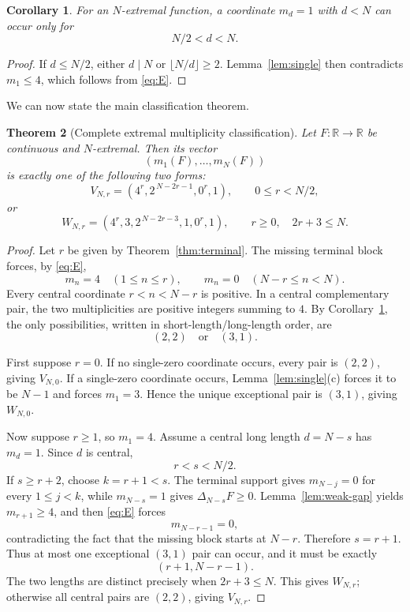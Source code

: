 \documentclass[11pt]{article}
\newtheorem{theorem}{Theorem}[section]
\newtheorem{corollary}[theorem]{Corollary}
\theoremstyle{definition}
\theoremstyle{remark}
\newcommand{\R}{\mathbb{R}}
\begin{document}
\begin{corollary}\label{cor:single-upper}
For an \(N\)-extremal function, a coordinate \(m_d=1\) with \(d<N\)
can occur only for
\[
N/2<d<N.
\]
\end{corollary}

\begin{proof}
If \(d\le N/2\), either \(d\mid N\) or
\(\lfloor N/d\rfloor\ge2\).  Lemma~\ref{lem:single} then contradicts
\(m_1\le4\), which follows from \eqref{eq:E}.
\end{proof}

We can now state the main classification theorem.

\begin{theorem}[Complete extremal multiplicity classification]
\label{thm:classification}
Let \(F:\R\to\R\) be continuous and \(N\)-extremal.
Then its vector
\[
(m_1(F),\ldots,m_N(F))
\]
is exactly one of the following two forms:
\[
V_{N,r}
=
(4^r,2^{\,N-2r-1},0^r,1),
\qquad 0\le r<N/2,
\tag{5.1}\label{eq:V}
\]
or
\[
W_{N,r}
=
(4^r,3,2^{\,N-2r-3},1,0^r,1),
\qquad r\ge0,\quad 2r+3\le N.
\tag{5.2}\label{eq:W}
\]
\end{theorem}

\begin{proof}
Let \(r\) be given by Theorem~\ref{thm:terminal}.  The missing terminal
block forces, by \eqref{eq:E},
\[
m_n=4\quad(1\le n\le r),
\qquad
m_n=0\quad(N-r\le n<N).
\]
Every central coordinate \(r<n<N-r\) is positive.  In a central
complementary pair, the two multiplicities are positive integers summing
to \(4\).  By Corollary~\ref{cor:single-upper}, the only possibilities,
written in short-length/long-length order, are
\[
(2,2)\quad\text{or}\quad(3,1).
\tag{5.3}
\]

First suppose \(r=0\).  If no single-zero coordinate occurs, every pair
is \((2,2)\), giving \(V_{N,0}\).  If a single-zero coordinate occurs,
Lemma~\ref{lem:single}(c) forces it to be \(N-1\) and forces
\(m_1=3\).  Hence the unique exceptional pair is \((3,1)\), giving
\(W_{N,0}\).

Now suppose \(r\ge1\), so \(m_1=4\).  Assume a central long length
\(d=N-s\) has \(m_d=1\).  Since \(d\) is central,
\[
r<s<N/2.
\]
If \(s\ge r+2\), choose \(k=r+1<s\).  The terminal support gives
\(m_{N-j}=0\) for every \(1\le j<k\), while \(m_{N-s}=1\) gives
\(\Delta_{N-s}F\ge0\).  Lemma~\ref{lem:weak-gap} yields
\(m_{r+1}\ge4\), and then \eqref{eq:E} forces
\[
m_{N-r-1}=0,
\]
contradicting the fact that the missing block starts at \(N-r\).
Therefore \(s=r+1\).  Thus at most one exceptional \((3,1)\) pair can
occur, and it must be exactly
\[
(r+1,N-r-1).
\]
The two lengths are distinct precisely when \(2r+3\le N\).  This gives
\(W_{N,r}\); otherwise all central pairs are \((2,2)\), giving
\(V_{N,r}\).
\end{proof}
\end{document}
